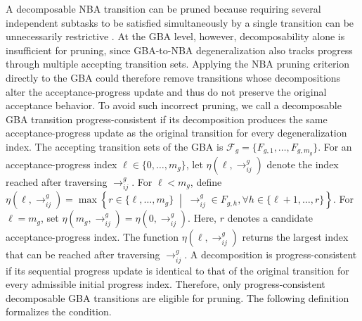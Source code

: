 \documentclass[lettersize,journal]{IEEEtran}
\theoremstyle{italiclemma}
\theoremstyle{italiclemma}
\theoremstyle{definition}
\begin{document}
A decomposable NBA transition can be pruned because requiring several independent subtasks to be satisfied simultaneously by a single transition can be unnecessarily restrictive \cite{liu2024time}. At the GBA level, however, decomposability alone is insufficient for pruning, since GBA-to-NBA degeneralization also tracks progress through multiple accepting transition sets. Applying the NBA pruning criterion directly to the GBA could therefore remove transitions whose decompositions alter the acceptance-progress update and thus do not preserve the original acceptance behavior. To avoid such incorrect pruning, we call a decomposable GBA transition progress-consistent if its decomposition produces the same acceptance-progress update as the original transition for every degeneralization index.
The accepting transition sets of the GBA is  $\mathcal{F}_g=\{F_{g,1},\ldots,F_{g,m_g}\}$. For an acceptance-progress index \(\ell\in\{0,\ldots,m_g\}\),  let
\(\eta(\ell,\rightarrow^g_{ij})\) denote the index reached after traversing \(\rightarrow^g_{ij}\). For \(\ell<m_g\),  define $ \eta(\ell,\rightarrow^g_{ij}) =\max\left\{ r\in\{\ell,\ldots,m_g\}\;\middle|\;\rightarrow^g_{ij}\in F_{g,h},  \forall h\in\{\ell+1,\ldots,r\}\right\}$. For \(\ell=m_g\), set $\eta(m_g,\rightarrow^g_{ij})=\eta(0,\rightarrow^g_{ij}).$ Here, $r$ denotes a candidate acceptance-progress index. The function
$\eta(\ell,\rightarrow^g_{ij})$ returns the largest index that can be reached after traversing \(\rightarrow^g_{ij}\). A decomposition is progress-consistent if its sequential progress update is identical to that of the original transition for every admissible initial progress index. Therefore, only progress-consistent decomposable
GBA transitions are eligible for pruning. The following definition formalizes the condition.
\end{document}
